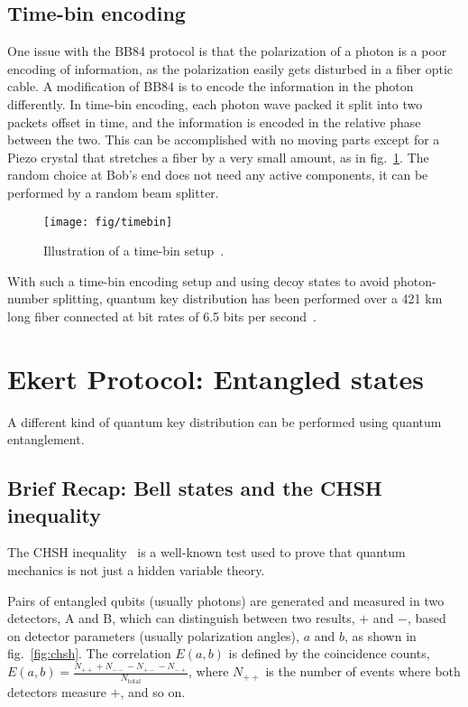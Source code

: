 \documentclass[12pt]{article}
\begin{document}
\subsection{Time-bin encoding}

One issue with the BB84 protocol is that the polarization of a photon is a poor encoding of information, as the polarization easily gets disturbed in a fiber optic cable.
A modification of BB84 is to encode the information in the photon differently.
In time-bin encoding, each photon wave packed it split into two packets offset in time, and the information is encoded in the relative phase between the two.
This can be accomplished with no moving parts except for a Piezo crystal that stretches a fiber by a very small amount, as in fig.~\ref{fig:timebin}.
The random choice at Bob's end does not need any active components, it can be performed by a random beam splitter.

\begin{figure}[h]
	\centering
	\texttt{[image: fig/timebin]}
	\caption{Illustration of a time-bin setup~\citep{boaron2018secure}.}
	\label{fig:timebin}
\end{figure}

With such a time-bin encoding setup and using decoy states to avoid photon-number splitting, quantum key distribution has been performed over a 421 km long fiber connected at bit rates of 6.5 bits per second~\citep{boaron2018secure}.

\section{Ekert Protocol: Entangled states}

A different kind of quantum key distribution can be performed using quantum entanglement.

\subsection{Brief Recap: Bell states and the CHSH inequality}

The CHSH inequality~\citep{PhysRevLett.23.880} is a well-known test used to prove that quantum mechanics is not just a hidden variable theory.

Pairs of entangled qubits (usually photons) are generated and measured in two detectors, A and B, which can distinguish between two results, $+$ and $-$, based on detector parameters (usually polarization angles), $a$ and $b$, as shown in fig.~\ref{fig:chsh}.
The correlation $E(a, b)$ is defined by the coincidence counts, $E(a, b) = \frac{N_{++}+N_{--}-N_{+-}-N_{-+}}{N_\text{total}}$, where $N_{++}$ is the number of events where both detectors measure $+$, and so on.
\end{document}
